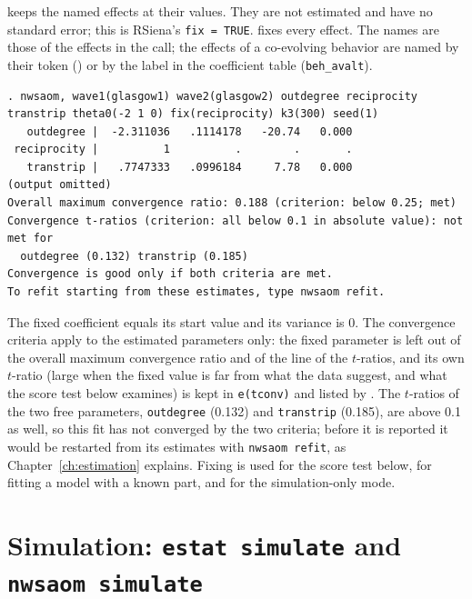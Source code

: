  keeps the named effects at their  values. They are not estimated and have no standard error; this is RSiena's \texttt{fix = TRUE}.  fixes every effect. The names are those of the effects in the call; the effects of a co-evolving behavior are named by their token () or by the label in the coefficient table (\texttt{beh\_avalt}).
\begin{lstlisting}
. nwsaom, wave1(glasgow1) wave2(glasgow2) outdegree reciprocity transtrip theta0(-2 1 0) fix(reciprocity) k3(300) seed(1)
   outdegree |  -2.311036   .1114178   -20.74   0.000
 reciprocity |          1          .        .       .
   transtrip |   .7747333   .0996184     7.78   0.000
(output omitted)
Overall maximum convergence ratio: 0.188 (criterion: below 0.25; met)
Convergence t-ratios (criterion: all below 0.1 in absolute value): not met for
  outdegree (0.132) transtrip (0.185)
Convergence is good only if both criteria are met.
To refit starting from these estimates, type nwsaom refit.
\end{lstlisting}
The fixed coefficient equals its start value and its variance is 0. The convergence criteria apply to the estimated parameters only: the fixed parameter is left out of the overall maximum convergence ratio and of the line of the $t$-ratios, and its own $t$-ratio (large when the fixed value is far from what the data suggest, and what the score test below examines) is kept in \texttt{e(tconv)} and listed by . The $t$-ratios of the two free parameters, \texttt{outdegree} (0.132) and \texttt{transtrip} (0.185), are above 0.1 as well, so this fit has not converged by the two criteria; before it is reported it would be restarted from its estimates with \texttt{nwsaom refit}, as Chapter~\ref{ch:estimation} explains. Fixing is used for the score test below, for fitting a model with a known part, and for the simulation-only mode.

\section{Simulation: \texttt{estat simulate} and \texttt{nwsaom simulate}}\label{sec:sim}

